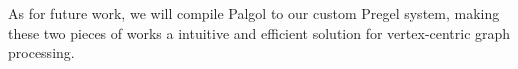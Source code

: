 \documentclass{sokendai_thesis} %
\begin{document}
As for future work, we will compile Palgol to our custom Pregel system, making these two pieces of works a intuitive and efficient solution for vertex-centric graph processing.





%





\begin{appendices}

%

\end{appendices}
\end{document}

